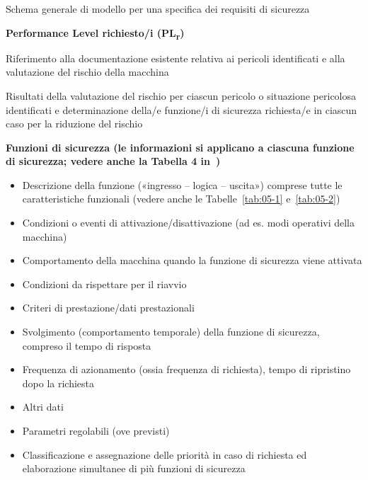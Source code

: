 \begin{riquadro}[label=box:06-1]{Schema generale di modello per una specifica dei requisiti di sicurezza}
\medskip
\begin{description}[font=\normalfont, align=left, leftmargin=1.3cm, labelwidth=1.1cm, labelsep=0.2cm, itemsep=0pt, parsep=0pt, topsep=0pt]
    \item[\textbf{3}] \textbf{Performance Level richiesto/i (PL\textsubscript{r})}
    \item[3.1] Riferimento alla documentazione esistente relativa ai pericoli identificati e alla valutazione del rischio della macchina
    \item[3.2] Risultati della valutazione del rischio per ciascun pericolo o situazione pericolosa identificati e determinazione della/e funzione/i di sicurezza richiesta/e in ciascun caso per la riduzione del rischio
\end{description}
\medskip
\begin{description}[font=\normalfont, align=left, leftmargin=1.3cm, labelwidth=1.1cm, labelsep=0.2cm, itemsep=0pt, parsep=0pt, topsep=0pt]
    \item[\textbf{4}] \textbf{Funzioni di sicurezza (le informazioni si applicano a ciascuna funzione di sicurezza; vedere anche la Tabella 4 in~\cite{cookbook6})}
    \begin{itemize}[label=--, leftmargin=1.2em, itemsep=0pt, parsep=0pt, topsep=0pt]
        \item Descrizione della funzione («ingresso -- logica -- uscita») comprese tutte le caratteristiche funzionali (vedere anche le Tabelle~\ref{tab:05-1} e~\ref{tab:05-2})
        \item Condizioni o eventi di attivazione/disattivazione (ad es. modi operativi della macchina)
        \item Comportamento della macchina quando la funzione di sicurezza viene attivata
        \item Condizioni da rispettare per il riavvio
        \item Criteri di prestazione/dati prestazionali
        \item Svolgimento (comportamento temporale) della funzione di sicurezza, compreso il tempo di risposta
        \item Frequenza di azionamento (ossia frequenza di richiesta), tempo di ripristino dopo la richiesta
        \item Altri dati
        \item Parametri regolabili (ove previsti)
        \item Classificazione e assegnazione delle priorità in caso di richiesta ed elaborazione simultanee di più funzioni di sicurezza

\end{itemize}
\end{description}
\end{riquadro}
